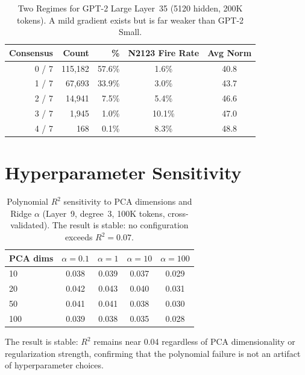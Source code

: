 \documentclass{article}
\begin{document}
\begin{table}[h]
\caption{Two Regimes for GPT-2 Large Layer~35 (5120 hidden, 200K tokens).
  A mild gradient exists but is far weaker than GPT-2 Small.}
\label{tab:large}
\centering
\begin{tabular}{rrrcc}
\toprule
Consensus & Count & \% & N2123 Fire Rate & Avg Norm \\
\midrule
0 / 7 & 115,182 & 57.6\% & 1.6\% & 40.8 \\
1 / 7 & 67,693  & 33.9\% & 3.0\% & 43.7 \\
2 / 7 & 14,941  & 7.5\%  & 5.4\% & 46.6 \\
3 / 7 & 1,945   & 1.0\%  & 10.1\% & 47.0 \\
4 / 7 & 168     & 0.1\%  & 8.3\% & 48.8 \\
\bottomrule
\end{tabular}
\end{table}

\section{Hyperparameter Sensitivity}
\label{app:hyperparams}

\begin{table}[h]
\caption{Polynomial $R^2$ sensitivity to PCA dimensions and Ridge $\alpha$ (Layer~9, degree~3,
  100K tokens, cross-validated). The result is stable: no configuration exceeds $R^2 = 0.07$.}
\label{tab:hyperparams}
\centering
\begin{tabular}{lcccc}
\toprule
PCA dims & $\alpha=0.1$ & $\alpha=1$ & $\alpha=10$ & $\alpha=100$ \\
\midrule
10  & 0.038 & 0.039 & 0.037 & 0.029 \\
20  & 0.042 & 0.043 & 0.040 & 0.031 \\
50  & 0.041 & 0.041 & 0.038 & 0.030 \\
100 & 0.039 & 0.038 & 0.035 & 0.028 \\
\bottomrule
\end{tabular}
\end{table}

The result is stable: $R^2$ remains near 0.04 regardless of PCA dimensionality or
regularization strength, confirming that the polynomial failure is not an artifact of
hyperparameter choices.
\end{document}
